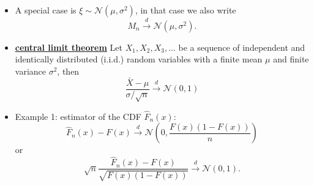 \documentclass[19pt,landscaoe]{article}
\begin{document}
\begin{itemize}
\begin{itemize}
\item A special case is $ \xi \sim \mathcal{N}(\mu, \sigma^2)$, in that case we also write
$$
M_n \stackrel{d}{\rightarrow} \mathcal{N}(\mu, \sigma^2).
$$


\item \underline{\bf central limit theorem} Let $X_1, X_2, X_3, \ldots$ be a sequence of independent and identically distributed (i.i.d.) random variables with a finite mean $\mu$ and finite variance $\sigma^2$, then
$$
   \frac{\bar X- \mu}{\sigma/\sqrt{n}}  \stackrel{d}{\rightarrow} \mathcal{N}(0, 1)
$$

\item Example 1: estimator of the CDF $ \hat F_n(x) $:
$$
  \hat F_n(x) - F(x)  \stackrel{d}{\rightarrow} \mathcal{N}\left(0, \frac{F(x)(1-F(x))}n\right)
$$
or
$$
 \sqrt{n} \frac{\hat F_n(x) - F(x)}{\sqrt{F(x)(1-F(x))}}  \stackrel{d}{\rightarrow} \mathcal{N}(0, 1).
$$



\end{itemize}


\end{itemize}

\newpage





    
    
    
    
\end{document}
